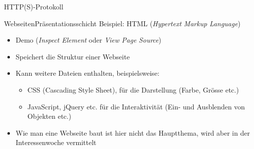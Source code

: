 \begin{frame}[fragile]{\faServer{} \acrshort{HTTP}(S)-Protokoll}
\begin{figure}[H]
{}
    \end{figure}
\end{frame}



\begin{frame}[fragile]{\faLaptop{} Webseiten}{Präsentationsschicht}
    Beispiel: \acrshort{HTML} (\textit{Hypertext Markup Language})
    \begin{itemize}[<+->]
        \item Demo (\textit{Inspect Element} oder \textit{View Page Source})
        \item Speichert die Struktur einer Webseite
        \item Kann weitere Dateien enthalten, beispielsweise:
              \begin{itemize}
                  \item CSS (Cascading Style Sheet), für die Darstellung (Farbe, Grösse etc.)
                  \item JavaScript, jQuery etc. für die Interaktivität (Ein- und Ausblenden von Objekten etc.)
              \end{itemize}
        \item Wie man eine Webseite baut ist hier nicht das Hauptthema, wird aber in der Interessenwoche vermittelt
    \end{itemize}
\end{frame}

